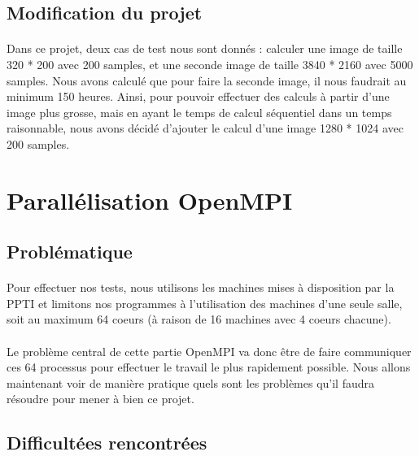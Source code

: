 \documentclass{article}
\begin{document}
\subsection{Modification du projet}
\paragraph{}
Dans ce projet, deux cas de test nous sont donn\'es : calculer une image de taille 320 * 200 avec 200 samples, et une seconde image de taille 3840 * 2160 avec 5000 samples.
Nous avons calcul\'e que pour faire la seconde image, il nous faudrait au minimum 150 heures.
Ainsi, pour pouvoir effectuer des calculs \`a partir d'une image plus grosse, mais en ayant le temps de calcul s\'equentiel dans un temps raisonnable, nous avons d\'ecid\'e d'ajouter le calcul d'une image 1280 * 1024 avec 200 samples.

\newpage

\section{Parall\'elisation OpenMPI}

\subsection{Probl\'ematique}

\paragraph{}
Pour effectuer nos tests, nous utilisons les machines mises \`a disposition par la PPTI et 
limitons nos programmes \`a l'utilisation des machines d'une seule salle, soit au maximum 64 coeurs (à raison de 16 machines avec 4 coeurs chacune).

\paragraph{}
Le probl\`eme central de cette partie OpenMPI va donc \^etre de faire communiquer ces 64 processus pour effectuer le travail
le plus rapidement possible. Nous allons maintenant voir de mani\`ere pratique quels sont les probl\`emes qu'il faudra r\'esoudre pour 
mener \`a bien ce projet.

\subsection{Difficult\'ees rencontr\'ees}
\end{document}
